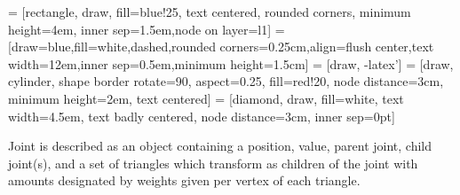 \documentclass{article}
\begin{document}
 = [rectangle, draw, fill=blue!25, text centered, rounded corners, minimum height=4em, inner sep=1.5em,node on layer=l1]
 = [draw=blue,fill=white,dashed,rounded corners=0.25cm,align=flush center,text width=12em,inner sep=0.5em,minimum height=1.5cm]
 = [draw, -latex']
 = [draw, cylinder, shape border rotate=90, aspect=0.25, fill=red!20, node distance=3cm, minimum height=2em, text centered]
 = [diamond, draw, fill=white, text width=4.5em, text badly centered, node distance=3cm, inner sep=0pt]

\newcommand{\nodebox}[2]{\parbox[c]{#1}{\centering #2}}

Joint is described as an object containing a position, value, parent joint, child joint(s), and a set of triangles which transform as children of the joint with amounts designated by weights given per vertex of each triangle.

\begin{figure}[h]
	\centering
	
\end{figure}

\begin{figure}[h]
	\centering
	\resizebox{\textwidth}{!} {
		
	}
\end{figure}

\end{document}
